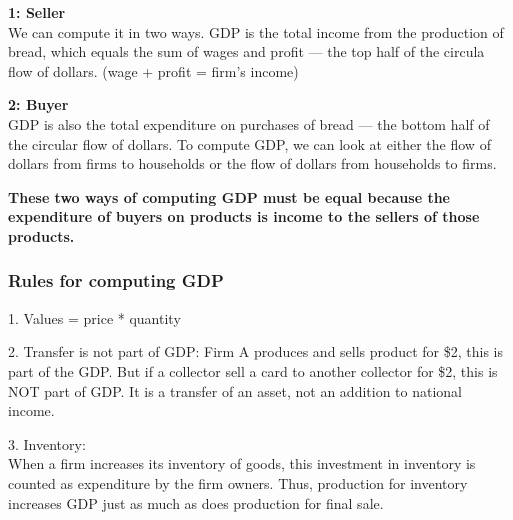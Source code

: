 \documentclass[12pt]{article}
\begin{document}
\begin{figure}[H]
\end{figure}
{\textbf {1: Seller}}\\
We can compute it in two ways. GDP is the total income from the production of bread,
which equals the sum of wages and profit — the top half of the circula  flow of dollars.
(wage + profit = firm's income) 

{\textbf {2: Buyer}}\\
GDP is also the total expenditure on purchases of bread — the bottom half of the 
circular flow of dollars. To compute GDP, we can look at either the flow of dollars
from firms to households or the flow of dollars from households to firms.


{\textbf {These two ways of computing GDP must be equal because the expenditure of
buyers on products is income to the sellers of those products.}}


\subsubsection{Rules for computing GDP}
1. Values = price * quantity

2. Transfer is not part of GDP: Firm A produces and sells product for \$2, this is part
of the GDP. But if a collector sell a card to another collector for \$2, this is NOT
part of GDP. It is a transfer of an asset, not an addition to national income.


3. Inventory:\\
When a firm increases its inventory of goods, this investment in inventory is counted as
expenditure by the firm owners. Thus, production for inventory increases GDP just as much
as does production for final sale.
\end{document}
